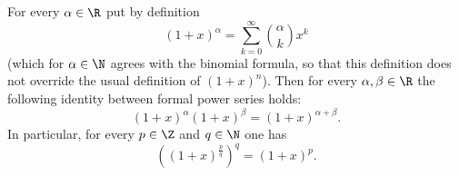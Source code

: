 \begin{cor}
\label{cor:GenBinom}
For every $\alpha \in \R$ put by definition
\[
(1 + x)^\alpha = \sum_{k=0}^\infty \binom{\alpha}{k} x^k
\]
(which for $\alpha \in \N$ agrees with the binomial formula, so that this definition does not override the usual definition of $(1+x)^n$).
Then for every $\alpha, \beta \in \R$ the following identity between formal power series holds:
\[
(1+x)^\alpha (1+x)^\beta = (1+x)^{\alpha + \beta}.
\]
In particular, for every $p \in \Z$ and $q \in \N$ one has
\[
\left( (1+x)^{\frac{p}{q}} \right)^q = (1+x)^p.
\]
\end{cor}